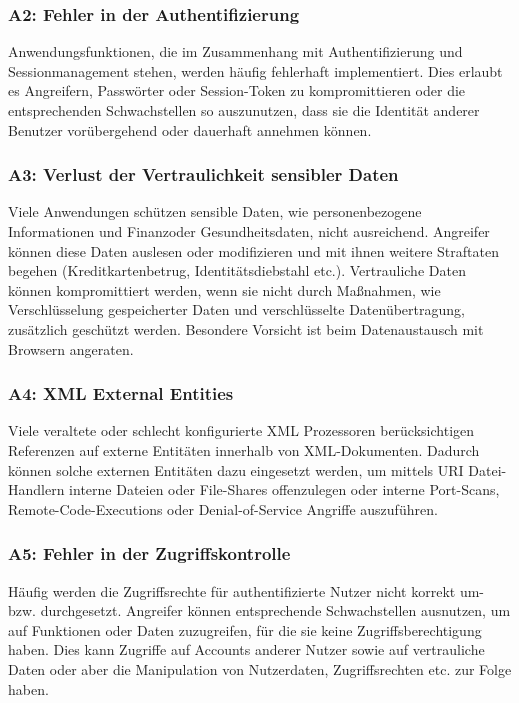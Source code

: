 \documentclass[12pt,oneside,a4paper,parskip]{scrbook}
\begin{document}
\subsubsection{A2: Fehler in der Authentifizierung}
Anwendungsfunktionen, die im Zusammenhang mit Authentifizierung und Sessionmanagement
stehen, werden häufig fehlerhaft implementiert. Dies erlaubt es Angreifern, Passwörter oder
Session-Token zu kompromittieren oder die entsprechenden Schwachstellen so auszunutzen,
dass sie die Identität anderer Benutzer vorübergehend oder dauerhaft annehmen können.

\subsubsection{A3: Verlust der Vertraulichkeit sensibler Daten}
Viele Anwendungen schützen sensible Daten, wie personenbezogene Informationen und Finanzoder
Gesundheitsdaten, nicht ausreichend. Angreifer können diese Daten auslesen oder
modifizieren und mit ihnen weitere Straftaten begehen (Kreditkartenbetrug, Identitätsdiebstahl
etc.). Vertrauliche Daten können kompromittiert werden, wenn sie nicht durch Maßnahmen, wie
Verschlüsselung gespeicherter Daten und verschlüsselte Datenübertragung, zusätzlich geschützt
werden. Besondere Vorsicht ist beim Datenaustausch mit Browsern angeraten.

\subsubsection{A4: XML External Entities}
Viele veraltete oder schlecht konfigurierte XML Prozessoren berücksichtigen Referenzen auf
externe Entitäten innerhalb von XML-Dokumenten. Dadurch können solche externen Entitäten
dazu eingesetzt werden, um mittels URI Datei-Handlern interne Dateien oder File-Shares offenzulegen
oder interne Port-Scans, Remote-Code-Executions oder Denial-of-Service Angriffe
auszuführen.

\subsubsection{A5: Fehler in der Zugriffskontrolle}
Häufig werden die Zugriffsrechte für authentifizierte Nutzer nicht korrekt um- bzw. durchgesetzt.
Angreifer können entsprechende Schwachstellen ausnutzen, um auf Funktionen oder Daten
zuzugreifen, für die sie keine Zugriffsberechtigung haben. Dies kann Zugriffe auf Accounts
anderer Nutzer sowie auf vertrauliche Daten oder aber die Manipulation von Nutzerdaten,
Zugriffsrechten etc. zur Folge haben.
\end{document}
